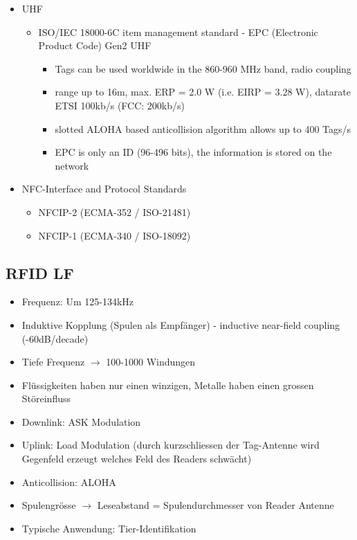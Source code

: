 \begin{itemize}
\begin{itemize}
			\end{itemize}
		\item UHF
			\begin{itemize}
				\item ISO/IEC 18000-6C item management standard - EPC (Electronic Product Code) Gen2 UHF
					\begin{itemize}
						\item Tags can be used worldwide in the 860-960 MHz band, radio coupling
						\item range up to 16m, max. ERP = 2.0 W (i.e. EIRP = 3.28 W), datarate ETSI 100kb/s (FCC: 200kb/s)
						\item slotted ALOHA based anticollision algorithm allows up to 400 Tags/s
						\item EPC is only an ID (96-496 bits), the information is stored on the network
					\end{itemize}
			\end{itemize}
		\item NFC-Interface and Protocol Standards
			\begin{itemize}
				\item NFCIP-2 (ECMA-352 / ISO-21481) 
				\item NFCIP-1 (ECMA-340 / ISO-18092) 
			\end{itemize}
	\end{itemize}	
	
\subsection{RFID LF}
	\begin{itemize}
		\item Frequenz: Um 125-134kHz
		\item Induktive Kopplung (Spulen als Empfänger) - inductive near-field coupling (-60dB/decade)
		\item Tiefe Frequenz $\rightarrow$ 100-1000 Windungen
		\item Flüssigkeiten haben nur einen winzigen, Metalle haben einen grossen Störeinfluss
		\item Downlink: ASK Modulation
		\item Uplink: Load Modulation (durch kurzschliessen der Tag-Antenne wird Gegenfeld erzeugt welches Feld des Readers schwächt)
		\item Anticollision: ALOHA
		\item Spulengrösse $\rightarrow$ Leseabstand = Spulendurchmesser von Reader Antenne
		\item Typische Anwendung: Tier-Identifikation
	\end{itemize}
	
